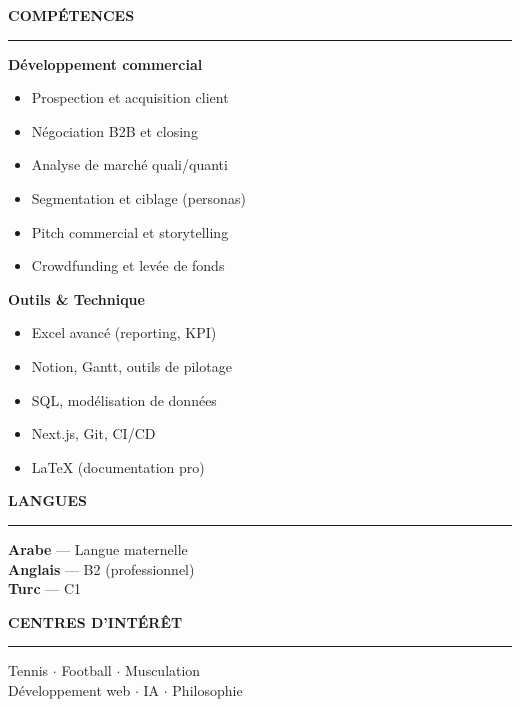 \documentclass[10.5pt,a4paper]{article}
\newcommand{\sidesection}[1]{
    \vspace{7pt}
    {\small\bfseries\color{darktext}\MakeUppercase{#1}}\\[-5pt]
    {\color{rulecolor}\rule{\linewidth}{0.7pt}}
    \vspace{3pt}
}
\begin{document}
{\begin{minipage}[t][297mm][t]{0.38\textwidth}
\begin{minipage}[t]{0.90\linewidth}
\sidesection{Comp\'etences}
{\small
\textbf{D\'eveloppement commercial}\\[2pt]
\begin{itemize}
\item Prospection et acquisition client
\item N\'egociation B2B et closing
\item Analyse de march\'e quali/quanti
\item Segmentation et ciblage (personas)
\item Pitch commercial et storytelling
\item Crowdfunding et lev\'ee de fonds
\end{itemize}

\vspace{5pt}
\textbf{Outils \& Technique}\\[2pt]
\begin{itemize}
\item Excel avanc\'e (reporting, KPI)
\item Notion, Gantt, outils de pilotage
\item SQL, mod\'elisation de donn\'ees
\item Next.js, Git, CI/CD
\item \LaTeX{} (documentation pro)
\end{itemize}
}

\sidesection{Langues}
{\small
\textbf{Arabe} — Langue maternelle\\
\textbf{Anglais} — B2 (professionnel)\\
\textbf{Turc} — C1
}

\sidesection{Centres d'int\'er\^et}
{\small
Tennis $\cdot$ Football $\cdot$ Musculation\\
D\'eveloppement web $\cdot$ IA $\cdot$ Philosophie
}

\end{minipage}
\end{minipage}%
}%
\end{document}
